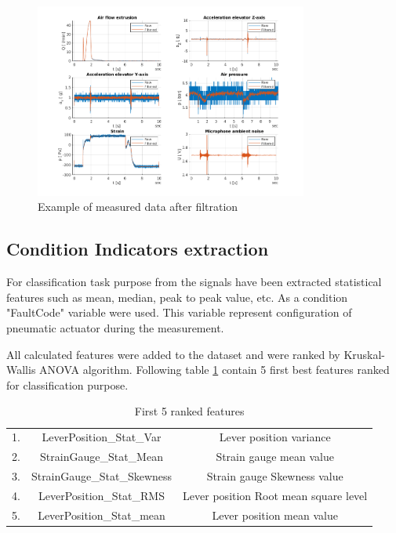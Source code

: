 \documentclass[class=article, crop=false]{standalone}
\begin{document}
\begin{figure}[h!]
    \centering
    \includegraphics[width=0.8\textwidth]{preprocessed_data.png}
    \caption{Example of measured data after filtration}
    \label{fig:preprocess}
\end{figure}


\subsection{Condition Indicators extraction}

For classification task purpose from the signals have been extracted
statistical features such as mean, median, peak to peak value, etc.
As a condition "FaultCode" variable
were used. This variable represent configuration of pneumatic actuator
during the measurement.

All calculated features were added to the dataset and were ranked by
Kruskal-Wallis ANOVA algorithm. Following table \ref{tab:feat} contain
5 first best features ranked for classification purpose.

\begin{table}[h]
    \centering
    \begin{tabular}{|c|c|c|}
        \hline
        1. & LeverPosition\_Stat\_Var & Lever position variance \\
        2. & StrainGauge\_Stat\_Mean  & Strain gauge mean value \\
        3. & StrainGauge\_Stat\_Skewness  & Strain gauge Skewness value \\
        4. & LeverPosition\_Stat\_RMS  & Lever position Root mean square
        level \\
        5. & LeverPosition\_Stat\_mean  & Lever position mean value \\ 
        \hline
    \end{tabular}
    \caption{First 5 ranked features}
    \label{tab:feat}
\end{table}
\end{document}
